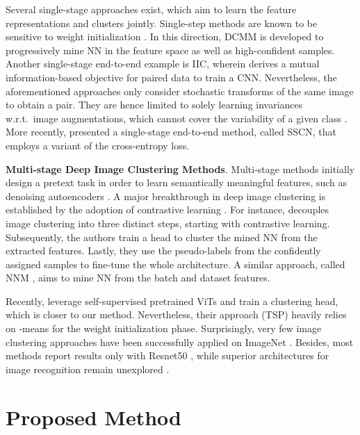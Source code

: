 \documentclass{bmvc2k}
\begin{document}
Several single-stage approaches exist, which aim to learn the feature representations and clusters jointly. Single-step methods are known to be sensitive to weight initialization \cite{dang2021nearest}. In this direction, DCMM is developed \cite{wu2019deep} to progressively mine NN in the feature space as well as high-confident samples. Another single-stage end-to-end example is IIC, wherein \cite{ji2019invariant} derives a mutual information-based objective for paired data to train a CNN. Nevertheless, the aforementioned approaches only consider stochastic transforms of the same image to obtain a pair. They are hence limited to solely learning invariances w.r.t.\ image augmentations, which cannot cover the variability of a given class \cite{dwibedi2021little}. More recently, \cite{sscn} presented a single-stage end-to-end method, called SSCN, that employs a variant of the cross-entropy loss.

\noindent\textbf{Multi-stage Deep Image Clustering Methods}.
Multi-stage methods initially design a pretext task in order to learn semantically meaningful features, such as denoising autoencoders \cite{xie2016unsupervised}. A major breakthrough in deep image clustering is established by the adoption of contrastive learning \cite{simclr,moco}. For instance, \cite{scan} decouples image clustering into three distinct steps, starting with contrastive learning. Subsequently, the authors train a head to cluster the mined NN from the extracted features. Lastly, they use the pseudo-labels from the confidently assigned samples to fine-tune the whole architecture. A similar approach, called NNM \cite{dang2021nearest}, aims to mine NN from the batch and dataset features. 

Recently, \cite{tsp} leverage self-supervised pretrained ViTs \cite{dino} and train a clustering head, which is closer to our method. Nevertheless, their approach (TSP) heavily relies on -means for the weight initialization phase. Surprisingly, very few image clustering approaches \cite{scan,sscn,sela} have been successfully applied on ImageNet \cite{deng2009imagenet}. Besides, most methods report results only with Resnet50 \cite{resnet}, while superior architectures for image recognition remain unexplored \cite{convnext,vit}.

\section{Proposed Method}
\label{method}

\newcommand{\pmi}{\operatorname{pmi}}
\newcommand{\pmib}{\pmi^\beta}
\newcommand{\bpmi}{\pmi^\beta}
\newcommand{\KL}[2]{\operatorname{KL}(#1 \parallel #2)}
\newcommand{\MI}[2]{\operatorname{I}(#1;#2)}
\newcommand{\Entropy}{\operatorname{H}}
\newcommand{\Expected}[2]{\operatorname{\mathbb{E}}_{#1} [#2]}
\newcommand{\pthet}{q}
\newcommand{\popt}{\pthet^*}
\newcommand{\pstud}{q_s}
\newcommand{\pteach}{q_t}
\newcommand{\probEma}{\operatorname{EMA}}
\end{document}
